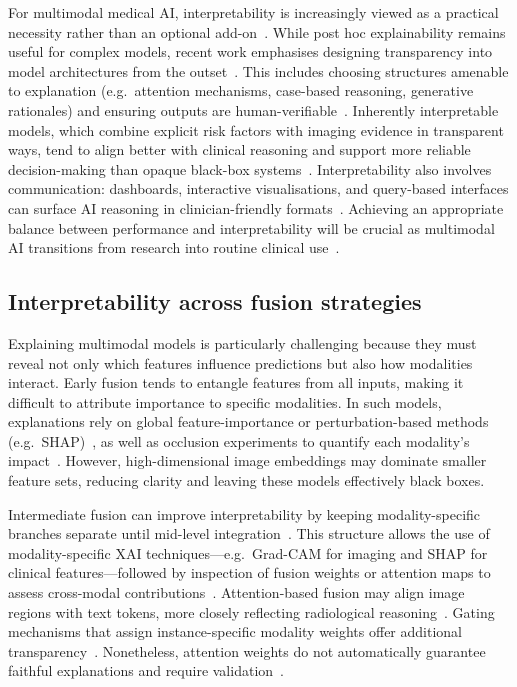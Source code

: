 For multimodal medical AI, interpretability is increasingly viewed as a practical necessity rather than an optional add-on~\cite{napravnik2025lessons,vani2025personalized}. While post hoc explainability remains useful for complex models, recent work emphasises designing transparency into model architectures from the outset~\cite{singh2025beyond}. This includes choosing structures amenable to explanation (e.g.\ attention mechanisms, case-based reasoning, generative rationales) and ensuring outputs are human-verifiable~\cite{sharma2025xai}. Inherently interpretable models, which combine explicit risk factors with imaging evidence in transparent ways, tend to align better with clinical reasoning and support more reliable decision-making than opaque black-box systems~\cite{houssein2025explainable,vani2025personalized,jungmann2023algorithmic}. Interpretability also involves communication: dashboards, interactive visualisations, and query-based interfaces can surface AI reasoning in clinician-friendly formats~\cite{pahud2024orchestrating,sharma2025xai}. Achieving an appropriate balance between performance and interpretability will be crucial as multimodal AI transitions from research into routine clinical use~\cite{vani2025personalized,chen2022explainable}.

\subsection{Interpretability across fusion strategies}

Explaining multimodal models is particularly challenging because they must reveal not only which features influence predictions but also how modalities interact. Early fusion tends to entangle features from all inputs, making it difficult to attribute importance to specific modalities. In such models, explanations rely on global feature-importance or perturbation-based methods (e.g.\ SHAP)~\cite{sharma2025xai,vani2025personalized}, as well as occlusion experiments to quantify each modality’s impact~\cite{vani2025personalized}. However, high-dimensional image embeddings may dominate smaller feature sets, reducing clarity and leaving these models effectively black boxes.

Intermediate fusion can improve interpretability by keeping modality-specific branches separate until mid-level integration~\cite{stahlschmidt2022}. This structure allows the use of modality-specific XAI techniques—e.g.\ Grad-CAM for imaging and SHAP for clinical features—followed by inspection of fusion weights or attention maps to assess cross-modal contributions~\cite{sharma2025xai}. Attention-based fusion may align image regions with text tokens, more closely reflecting radiological reasoning~\cite{sharma2025xai}. Gating mechanisms that assign instance-specific modality weights offer additional transparency~\cite{sharma2025xai}. Nonetheless, attention weights do not automatically guarantee faithful explanations and require validation~\cite{napravnik2025lessons,pahud2024orchestrating}.

